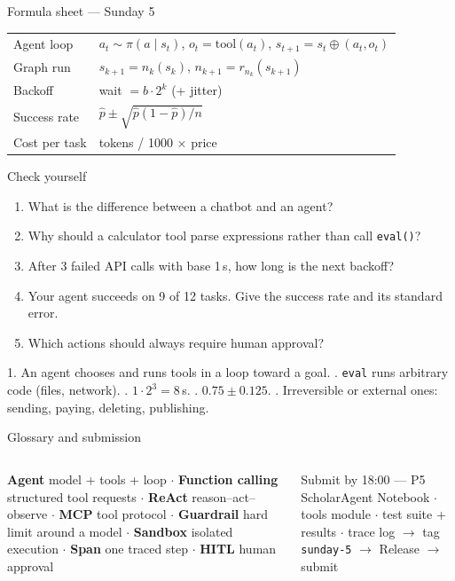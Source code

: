 \documentclass[aspectratio=169,11pt]{beamer}
\begin{document}
\begin{frame}{Formula sheet --- Sunday 5}
\renewcommand{\arraystretch}{1.35}
\begin{tabularx}{\linewidth}{l X}
\toprule
Agent loop & $a_t\sim\pi(a\mid s_t)$, \; $o_t=\mathrm{tool}(a_t)$, \; $s_{t+1}=s_t\oplus(a_t,o_t)$\\
Graph run & $s_{k+1}=n_k(s_k)$, \; $n_{k+1}=r_{n_k}(s_{k+1})$\\
Backoff & wait $=b\cdot2^{k}$ (+ jitter)\\
Success rate & $\hat p\pm\sqrt{\hat p(1-\hat p)/n}$\\
Cost per task & tokens / 1000 $\times$ price\\
\bottomrule
\end{tabularx}
\end{frame}

\begin{frame}{Check yourself}
\begin{enumerate}
\item What is the difference between a chatbot and an agent?
\item Why should a calculator tool parse expressions rather than call \texttt{eval()}?
\item After 3 failed API calls with base 1\,s, how long is the next backoff?
\item Your agent succeeds on 9 of 12 tasks. Give the success rate and its standard error.
\item Which actions should always require human approval?
\end{enumerate}
\begin{bex}[Answers]
1. An agent chooses and runs tools in a loop toward a goal. . \texttt{eval} runs arbitrary code (files, network). . $1\cdot2^3=8$\,s. . $0.75\pm0.125$. . Irreversible or external ones: sending, paying, deleting, publishing.
\end{bex}
\end{frame}

\begin{frame}{Glossary and submission}
\begin{columns}[T]
\begin{bdef}[Glossary]
\textbf{Agent} model + tools + loop $\cdot$ \textbf{Function calling} structured tool requests $\cdot$ \textbf{ReAct} reason--act--observe $\cdot$ \textbf{MCP} tool protocol $\cdot$ \textbf{Guardrail} hard limit around a model $\cdot$ \textbf{Sandbox} isolated execution $\cdot$ \textbf{Span} one traced step $\cdot$ \textbf{HITL} human approval
\end{bdef}
\begin{block}{Submit by 18:00 --- P5 ScholarAgent}
Notebook $\cdot$ tools module $\cdot$ test suite + results $\cdot$ trace log $\rightarrow$ tag \texttt{sunday-5} $\rightarrow$ Release $\rightarrow$ submit
\end{block}
\end{columns}
\end{frame}
\end{document}

